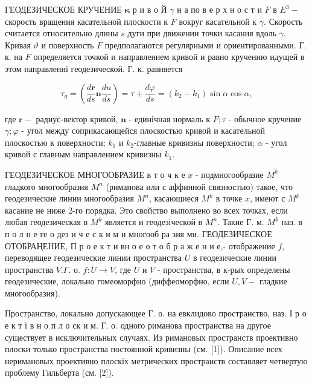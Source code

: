 \documentclass[10pt]{article}
\begin{document}
ГЕОДЕЗИЧЕСКОЕ КРУЧЕНИЕ $\boldsymbol{\kappa}$ р и в о Й $\gamma$ н а по в е р х н о с т и $F$ в $E^{3}-$ скорость вращения касательной плоскости к $F$ вокруг касательной к $\gamma$. Скорость считается относительно длины $s$ дуги при движении точки касания вдоль $\gamma$. Кривая $\vartheta$ и поверхность $F$ предполагаются регулярными и ориентированными. $Г$. к. на $F$ определяется точкой и направлением кривой и равно кручению идущей в этом направлениі геодезической. Г. к. равняется



\[

\tau_{g}=\left(\frac{d \boldsymbol{r}}{d s} \boldsymbol{n} \frac{d n}{d s}\right)=\tau+\frac{d \varphi}{d s}=\left(k_{2}-k_{1}\right) \sin \alpha \cos \alpha,

\]



где $\boldsymbol{r}-$ радиус-вектор кривой, $\boldsymbol{n}$ - единічная нормаль к $F ; \tau$ - обычное кручение $\gamma ; \varphi$ - угол между соприкасающейся плоскостью кривой и касательной плоскостью к поверхности; $k_{1}$ и $k_{2}$-главные кривизны поверхности; $\alpha$ - угол кривой с главным направлением кривизны $k_{1}$.



ГЕОДЕЗИЧЕСКОЕ МНОГООБРАЗИЕ в т о ч к е $x$ - подмногообразие $M^{k}$ гладкого многообразия $M^{n}$ (риманова или с аффинной связностью) такое, что геодезические линии многообразия $M^{n}$, касающиеся $M^{k}$ в точке $x$, имеют с $M^{k}$ касание не ниже 2-го порядка. Это свойство выполнено во всех точках, если любая геодезическая в $M^{k}$ является и геодезіческой в $M^{n}$. Такие Г. м. $M^{k}$ наз. в п о л н е ге о дез и ч е с к и м и многооб ра зия ми. ГЕОДЕЗИЧЕСКОЕ ОТОБРАҢЕНИЕ, П р о е к т и вн о е о т о б р а ж е н и е,- отображение $f$, переводящее геодезические линии пространства $U$ в геодезические линии пространства $V . \Gamma$. о. $f: U \rightarrow V$, где $U$ и $V$ - пространства, в к-рых определены геодезические, локально гомеоморфно (диффеоморфно, если $U, V-$ гладкие многообразия).



Пространство, локально допускающее $Г$. о. на евклидово пространство, наз. І р о е к т і в н о п л о ск и м. Г. о. одного риманова пространства на другое существует в исключительных случаях. Из римановых пространств проективно плоски только пространства постоянной кривизны (см. [1]). Описание всех неримановых проективно плоскіх метрических пространств составляет четвертую проблему Гильберта (см. [2]).
\end{document}
